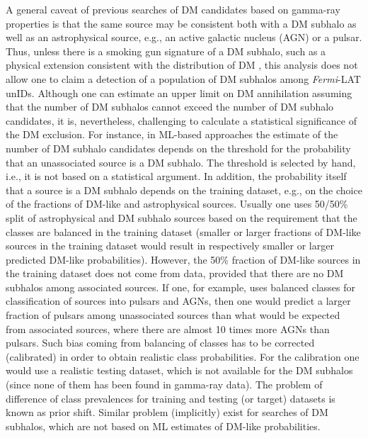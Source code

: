 \documentclass[12pt, a4paper]{article}
\newcommand{\Fermi}{{\textit{Fermi}}}
\begin{document}
A general caveat of previous searches of DM candidates based on gamma-ray properties is that the same source may be consistent both with a DM subhalo as well as an astrophysical source, e.g., an active galactic nucleus (AGN) or a pulsar.
Thus, unless there is a smoking gun signature of a DM subhalo, such as a physical extension consistent with the distribution of DM 
\cite{2014PhRvD..89a6014B, 2015JCAP...12..035B, 2017PhRvD..96f3009C, 2022PhRvD.105h3006C, 2019JCAP...11..045C}, this analysis does not allow one to claim a detection of a population of DM subhalos among \Fermi-LAT unIDs.
Although one can estimate an upper limit on DM annihilation assuming that the number of DM subhalos cannot exceed the number of DM subhalo candidates,
it is, nevertheless, challenging to calculate a statistical significance of the DM exclusion.
For instance, in ML-based approaches the estimate of the number of DM subhalo candidates depends on the threshold for the probability that an unassociated source is a DM subhalo.
The threshold is selected by hand, i.e., it is not based on a statistical argument. In addition, the probability itself that a source is a DM subhalo depends on the training dataset, e.g., on the choice of the fractions of DM-like and astrophysical sources. Usually one uses 50/50\% split of astrophysical and DM subhalo sources based on the requirement that the classes are balanced in the training dataset (smaller or larger fractions of DM-like sources in the training dataset would result in respectively smaller or larger predicted DM-like probabilities). However, the 50\% fraction of DM-like sources in the training dataset does not come from data, provided that there are no DM subhalos among associated sources. If one, for example, uses balanced classes for classification of sources into pulsars and AGNs, then one would predict a larger fraction of pulsars among unassociated sources
than what would be expected from associated sources, where there are almost 10 times more AGNs than pulsars. Such bias coming from balancing of classes has to be corrected (calibrated) in order to obtain realistic class probabilities.
For the calibration one would use a realistic testing dataset, which is not available for the DM subhalos (since none of them has been found in gamma-ray data).
The problem of difference of class prevalences for training and testing (or target) datasets is known as prior shift.
Similar problem (implicitly) exist for searches of DM subhalos, which are not based on ML estimates of DM-like probabilities.
\end{document}
